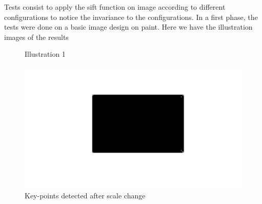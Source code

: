 \documentclass[12pt]{article}
\begin{document}
Tests consist to apply the sift function on image according to different configurations to notice the invariance to the configurations.
In a first phase, the tests were done on a basic image design on paint. 
Here we have the illustration images  of the results

\begin{figure}[!h]
\centering     %
{}
\caption{Illustration 1}
\end{figure}

\begin{figure}[!h]
    \center
    \includegraphics[scale=0.2]{scal1.jpg}
    \caption{Key-points detected after scale change}
    \label{figure:Illustration }
   \end{figure}
   \clearpage
\end{document}
